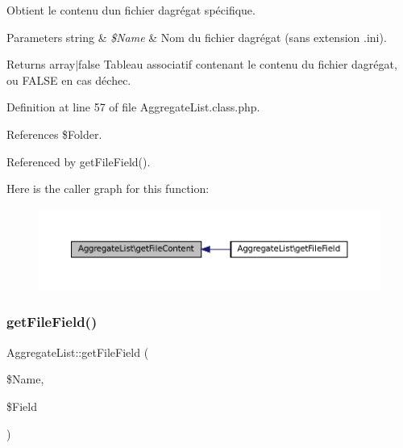 Obtient le contenu d\textquotesingle{}un fichier d\textquotesingle{}agrégat spécifique.


\begin{DoxyParams}[1]{Parameters}
string & {\em \$\+Name} & Nom du fichier d\textquotesingle{}agrégat (sans extension .ini). \\
\hline
\end{DoxyParams}
\begin{DoxyReturn}{Returns}
array$\vert$false Tableau associatif contenant le contenu du fichier d\textquotesingle{}agrégat, ou F\+A\+L\+SE en cas d\textquotesingle{}échec. 
\end{DoxyReturn}


Definition at line 57 of file Aggregate\+List.\+class.\+php.



References \$\+Folder.



Referenced by get\+File\+Field().

Here is the caller graph for this function\+:\nopagebreak
\begin{figure}[H]
\begin{center}
\leavevmode
\includegraphics[width=350pt]{class_aggregate_list_a24c68fc9f46133f4e975621dd176e2e9_icgraph}
\end{center}
\end{figure}
\mbox{\label{class_aggregate_list_a74c1ba53120bbe24223f3812c53f8084}} 
\subsubsection{\texorpdfstring{get\+File\+Field()}{getFileField()}}
{\footnotesize\ttfamily Aggregate\+List\+::get\+File\+Field (\begin{DoxyParamCaption}\item[{}]{\$\+Name,  }\item[{}]{\$\+Field }\end{DoxyParamCaption})}

